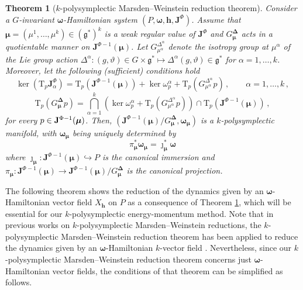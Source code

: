 \documentclass[11pt]{article}
\theoremstyle{plain}
\newtheorem{theorem}{Theorem}[section]
\theoremstyle{definition}
\newcommand{\T}{\mathrm{T}}
\newcommand{\bomega}{{\boldsymbol{\omega}}}
\newcommand{\bh}{{\boldsymbol{h}}}
\newcommand{\Lg}{\mathfrak{g}}
\newcommand{\x}{\times}
\numberwithin{equation}{section}
\begin{document}
\begin{theorem}[$k$-polysymplectic Marsden--Weinstein reduction theorem]\label{Th::PolisymplecticReductionJ}
    Consider a $G$-invariant $\bomega$-Hamiltonian system  $(P,\bomega,\bm h,\mathbf{J}^\Phi)$. Assume that $\boldsymbol\mu=(
    \mu^1,\ldots,
    \mu^k)\in (\Lg^*)^k$ is a weak regular value of $\mathbf{J}^\Phi$ and $G_{\boldsymbol\mu}^{\boldsymbol\Delta}$ acts in a quotientable manner on $\mathbf{J}^{\Phi-1}(\boldsymbol\mu)$. Let $G^{
    \Delta^\alpha}_{\mu^\alpha}$ denote the isotropy group at $\mu^\alpha$ of the Lie group action $\Delta^\alpha:(g,\vartheta)\in G\x\mathfrak{g}^*\mapsto  \Delta^\alpha(g,\vartheta)\in \mathfrak{g}^*$ for $\alpha=1,\ldots,k$. Moreover, let the following (sufficient) conditions hold
    \begin{equation}\label{Eq::PolysymplecticReduction1eq}
        \ker (\T_p\mathbf{J}_\alpha^\Phi) = \T_p(\mathbf{J}^{\Phi-1}(\boldsymbol\mu))+\ker\omega^\alpha_p + \T_p(G^{\Delta^\alpha}_{\mu^\alpha} p)\,,\qquad \alpha=1,\ldots,k\,,
    \end{equation}
    \begin{equation}\label{Eq::PolysymplecticReduction2eq}
        \T_p(G_{\boldsymbol\mu}^{\boldsymbol\Delta} p) = \bigcap^k_{\alpha=1}\left(\ker\omega^\alpha_p+\T_p(G^{\Delta^\alpha}_{\mu^\alpha}p)\right)\cap \T_p(\mathbf{J}^{\Phi-1}(\boldsymbol\mu))\,,
    \end{equation}
    for every $p\in {\bf J}^{\Phi-1}({\boldsymbol \mu})$. Then,  $(\mathbf{J}^{\Phi-1}(\boldsymbol\mu)/G^{\boldsymbol\Delta}_{\boldsymbol\mu},\bomega_{\boldsymbol\mu})$ is a $k$-polysymplectic manifold, with ${\bomega}_{\boldsymbol \mu}$ being uniquely determined by
    \[ \pi_{\boldsymbol\mu}^*\bomega_{\boldsymbol\mu}=\jmath_{\boldsymbol\mu}^*\bomega
    \]
    where $\jmath_{\boldsymbol\mu}:\mathbf{J}^{\Phi-1}(\boldsymbol\mu)\hookrightarrow P$ is the canonical immersion and $\pi_{\boldsymbol\mu}:\mathbf{J}^{\Phi-1}(\boldsymbol\mu)\rightarrow \mathbf{J}^{\Phi-1}(\boldsymbol\mu)/G^{\boldsymbol\Delta}_{\boldsymbol\mu}$ is the canonical projection.
\end{theorem}


The following theorem shows the reduction of the dynamics given by an $\bomega$-Hamiltonian vector field $X_{\bh}$ on $P$ as a consequence of Theorem \ref{Th::PolisymplecticReductionJ}, which will be essential for our $k$-polysymplectic energy-momentum method. Note that in  previous works on $k$-polysymplectic Marsden--Weinstein reductions, the $k$-polysymplectic Marsden--Weinstein  reduction theorem has been applied to reduce the dynamics given by an ${\bm \omega}$-Hamiltonian $k$-vector field \cite[Theorem 4.4]{MRSV_15}. Nevertheless, since our $k$-polysymplectic Marsden--Weinstein reduction theorem concerns just ${\bm \omega}$-Hamiltonian vector fields, the conditions of that theorem can be simplified as follows.
\end{document}
